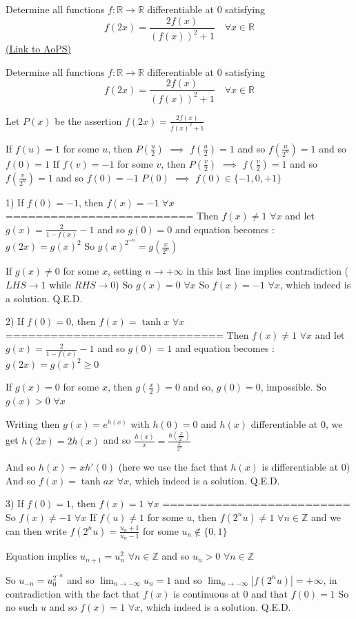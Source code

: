 \begin{problem}
	Determine all functions $f: \mathbb R\to\mathbb R$ differentiable at $0$ satisfying \[f (2x) = \frac{2f(x)}{(f (x))^2 +1} \quad \forall x\in\mathbb R\]
	\flushright \href{https://artofproblemsolving.com/community/c6h568650}{(Link to AoPS)}
\end{problem}



\begin{solution}
	\begin{tcolorbox}Determine all functions $f: \mathbb R\to\mathbb R$ differentiable at $0$ satisfying \[f (2x) = \frac{2f(x)}{(f (x))^2 +1} \quad \forall x\in\mathbb R\]\end{tcolorbox}
Let $P(x)$ be the assertion $f(2x)=\frac{2f(x)}{f(x)^2+1}$

If $f(u)=1$ for some $u$, then $P(\frac u2)$ $\implies$ $f(\frac u2)=1$ and so $f(\frac u{2^n})=1$ and so $f(0)=1$
If $f(v)=-1$ for some $v$, then $P(\frac v2)$ $\implies$ $f(\frac v2)=1$ and so $f(\frac v{2^n})=1$ and so $f(0)=-1$
$P(0)$ $\implies$ $f(0)\in\{-1,0,+1\}$

1) If $f(0)=-1$, then $f(x)=-1$ $\forall x$
=========================
Then $f(x)\ne 1$ $\forall x$ and let $g(x)=\frac 2{1-f(x)}-1$ and so $g(0)=0$ and equation becomes : $g(2x)=g(x)^2$
So $g(x)^{2^{-n}}=g(\frac x{2^n})$

If $g(x)\ne 0$ for some $x$, setting $n\to +\infty$ in this last line implies contradiction ($LHS\to 1$ while $RHS\to 0$)
So $g(x)=0$ $\forall x$
So $\boxed{f(x)=-1}$ $\forall x$, which indeed is a solution.
Q.E.D.

2) If $f(0)=0$, then $f(x)=\tanh x$ $\forall x$
=============================
Then $f(x)\ne 1$ $\forall x$ and let $g(x)=\frac 2{1-f(x)}-1$ and so $g(0)=1$ and equation becomes : $g(2x)=g(x)^2\ge 0$

If $g(x)=0$ for some $x$, then $g(\frac x2)=0$ and so, $g(0)=0$, impossible. So $g(x)>0$ $\forall x$

Writing then $g(x)=e^{h(x)}$ with $h(0)=0$ and $h(x)$ differentiable at $0$, we get $h(2x)=2h(x)$ and so $\frac{h(x)}x=\frac{h(\frac x{2^n})}{\frac x{2^n}}$

And so $h(x)=xh'(0)$ (here we use the fact that $h(x)$ is differentiable at $0$)
And so $\boxed{f(x)=\tanh ax}$ $\forall x$, which indeed is a solution.
Q.E.D.

3) If $f(0)=1$, then $f(x)=1$ $\forall x$
=========================
So $f(x)\ne -1$ $\forall x$
If $f(u)\ne 1$ for some $u$, then $f(2^nu)\ne 1$ $\forall n\in\mathbb Z$ and we can then write $f(2^nu)=\frac{u_n+1}{u_n-1}$ for some $u_n\notin\{0,1\}$

Equation implies $u_{n+1}=u_n^2$ $\forall n\in\mathbb Z$ and so $u_n>0$ $\forall n\in\mathbb Z$

So $u_{-n}=u_0^{2^{-n}}$ and so $\lim_{n\to -\infty}u_n=1$ and so $\lim_{n\to-\infty}|f(2^nu)|=+\infty$, in contradiction with the fact that $f(x)$ is continuous at $0$ and that $f(0)=1$
So no such $u$  and so $\boxed{f(x)=1}$ $\forall x$, which indeed is a solution.
Q.E.D.
\end{solution}

